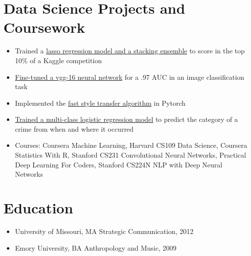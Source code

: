 \documentclass[11pt]{article}
\begin{document}
	\section{Data Science Projects and Coursework}
		\begin{itemize}
			\item Trained a \href{https://github.com/ryankresse/ames_housing}{lasso regression model and a stacking ensemble} to score in the top 10\% of a Kaggle competition
			\item \href{https://github.com/ryankresse/invasive_species}{Fine-tuned a vgg-16 neural network} for a .97 AUC in an image classification task
			\item Implemented the \href{https://github.com/ryankresse/fast_style_transfer_pytorch}{fast style transfer algorithm} in Pytorch
			\item \href{https://github.com/ryankresse/sf-crime}{Trained a multi-class logistic regression model} to predict the category of a crime from when and where it occurred
			\item Courses: Coursera Machine Learning, Harvard CS109 Data Science, Coursera Statistics With R, Stanford CS231 Convolutional Neural Networks, Practical Deep Learning For Coders, Stanford CS224N NLP with Deep Neural Networks
		\end{itemize}

	\section{Education}
		\begin{itemize}
			\item University of Missouri, MA Strategic Communication, 2012
			\item Emory University, BA Anthropology and Music, 2009


		\end{itemize}
\end{document}

